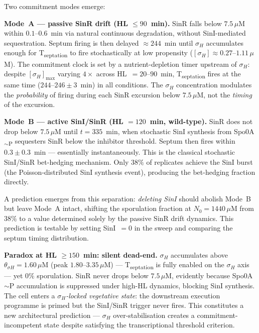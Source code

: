\documentclass[11pt,a4paper]{article}
\begin{document}
Two commitment modes emerge:

\textbf{Mode~A --- passive SinR drift (HL $\leq 90$~min).}
SinR falls below $7.5\,\mu$M within $0.1$--$0.6$~min via natural
continuous degradation, without SinI-mediated sequestration.
Septum firing is then delayed $\approx 244$~min until $\sigma_H$
accumulates enough for T\textsubscript{septation} to fire stochastically
at low propensity ($[\sigma_H] \approx 0.27$--$1.11\,\mu$M).  The
commitment clock is set by a nutrient-depletion timer upstream of
$\sigma_H$: despite $[\sigma_H]_{\max}$ varying $4\times$ across
HL~$= 20$--$90$~min, T\textsubscript{septation} fires at the same time
($244$--$246 \pm 3$~min) in all conditions.  The $\sigma_H$ concentration
modulates the \emph{probability} of firing during each SinR excursion
below $7.5\,\mu$M, not the \emph{timing} of the excursion.

\textbf{Mode~B --- active SinI/SinR (HL $= 120$~min, wild-type).}
SinR does not drop below $7.5\,\mu$M until $t = 335$~min, when
stochastic SinI synthesis from Spo0A\textsubscript{$\sim$P}
sequesters SinR below the inhibitor threshold.  Septum then fires
within $0.3 \pm 0.3$~min --- essentially instantaneously.
This is the classical stochastic SinI/SinR bet-hedging mechanism.
Only $38\%$ of replicates achieve the SinI burst (the Poisson-distributed
SinI synthesis event), producing the bet-hedging fraction directly.

A prediction emerges from this separation: \emph{deleting SinI} should
abolish Mode~B but leave Mode~A intact, shifting the sporulation
fraction at $N_0 = 1440\,\mu$M from $38\%$ to a value determined
solely by the passive SinR drift dynamics.  This prediction is testable
by setting SinI~$= 0$ in the sweep and comparing the septum timing
distribution.

\textbf{Paradox at HL $\geq 150$~min: silent dead-end.}
$\sigma_H$ accumulates above $\theta_{\sigma H} = 1.60\,\mu$M
(peak $1.80$--$3.35\,\mu$M) --- T\textsubscript{septation} is fully
enabled on the $\sigma_H$ axis --- yet $0\%$ sporulation.
SinR never drops below $7.5\,\mu$M, evidently because Spo0A$\sim$P
accumulation is suppressed under high-HL dynamics, blocking SinI
synthesis.  The cell enters a \emph{$\sigma_H$-locked vegetative state}:
the downstream execution programme is primed but the SinI/SinR trigger
never fires.  This constitutes a new architectural prediction --- $\sigma_H$
over-stabilisation creates a commitment-incompetent state despite
satisfying the transcriptional threshold criterion.
\end{document}
